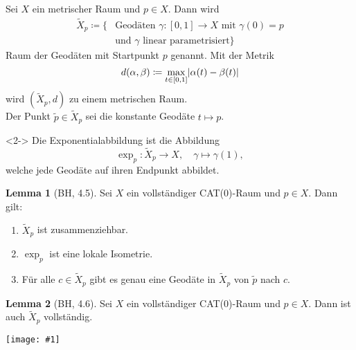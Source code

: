 \documentclass{beamer}
\newcommand{\I}{\left[0,1\right]} %
\renewcommand{\emph}[1]{\textcolor{Emph}{#1}}
\DeclarePairedDelimiter\abs{\lvert}{\rvert}%
\theoremstyle{definition}
\newtheorem*{lem}{Lemma}
\newcommand{\framedgraphic}[1] {
  \begin{frame}
    \begin{center}
      \vspace{-10pt}
      \texttt{[image: \#1]}
    \end{center}
  \end{frame}
}
\begin{document}
\begin{frame}
  \begin{definition}
    Sei $X$ ein metrischer Raum und $p \in X$. Dann wird
    \begin{align*}
      \tilde{X}_p \coloneqq \{ &\text{Geodäten } \gamma : \I \to X \text{ mit } \gamma(0) = p\\
      &\text{und $\gamma$ linear parametrisiert} \}
    \end{align*}
    \emph{Raum der Geodäten mit Startpunkt $p$} genannt. Mit der Metrik
    \[ d(\alpha, \beta) \coloneqq \max_{t \in \I} \abs{\alpha(t) - \beta(t)} \]
    wird $(\tilde{X}_p, d)$ zu einem metrischen Raum.\\
    Der Punkt $\tilde{p} \in \tilde{X}_p$ sei die konstante Geodäte $t \mapsto p$.
  \end{definition}

  \begin{definition}<2->
    Die \emph{Exponentialabbildung} ist die Abbildung
    \[ \exp_p : \tilde{X}_p \to X, \quad \gamma \mapsto \gamma(1), \]
    welche jede Geodäte auf ihren Endpunkt abbildet.
  \end{definition}
\end{frame}

\begin{frame}
  \begin{lem}[BH, 4.5]
    Sei $X$ ein vollständiger CAT($0$)-Raum und $p \in X$. Dann gilt:
    \begin{enumerate}
      \item $\tilde{X}_p$ ist zusammenziehbar.
      \item $\exp_p$ ist eine lokale Isometrie. %
      \item Für alle $c {\in} \tilde{X}_p$ gibt es genau eine Geodäte in $\tilde{X}_p$ von $\tilde{p}$ nach $c$.
    \end{enumerate}
  \end{lem}
\end{frame}

\begin{frame}
  \begin{lem}[BH, 4.6]
    Sei $X$ ein vollständiger CAT($0$)-Raum und $p \in X$. Dann ist auch $\tilde{X}_p$ vollständig.
  \end{lem}
\end{frame}


\framedgraphic{bilder/cat.jpg}
\end{document}
